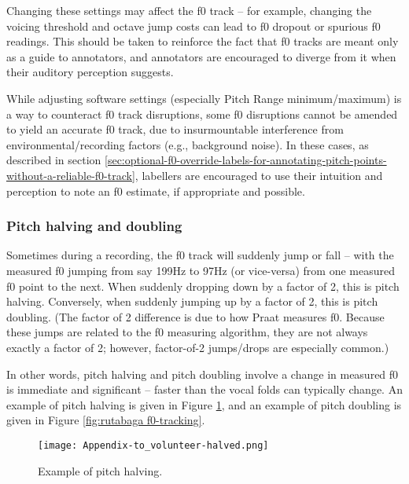 Changing these settings may affect the f0 track – for example, changing the voicing threshold and octave jump costs can lead to f0 dropout or spurious f0 readings. This should be taken to reinforce the fact that f0 tracks are meant only as a guide to annotators, and annotators are encouraged to diverge from it when their auditory perception suggests. 

While adjusting software settings (especially Pitch Range minimum\slash maximum) is a way to counteract f0 track disruptions, some f0 disruptions cannot be amended to yield an accurate f0 track, due to insurmountable interference from environmental\slash recording factors (e.g., background noise). In these cases, as described in section \ref{sec:optional-f0-override-labels-for-annotating-pitch-points-without-a-reliable-f0-track}, labellers are encouraged to use their intuition and perception to note an f0 estimate, if appropriate and possible. 

\subsubsection{Pitch halving and doubling}\label{sec:pitch-halving-and-doubling}

Sometimes during a recording, the f0 track will suddenly jump or fall – with the measured f0 jumping from say 199Hz to 97Hz (or vice-versa) from one measured f0 point to the next. When suddenly dropping down by a factor of 2, this is pitch halving. Conversely, when suddenly jumping up by a factor of 2, this is pitch doubling. (The factor of 2 difference is due to how Praat measures f0. Because these jumps are related to the f0 measuring algorithm, they are not always exactly a factor of 2; however, factor-of-2 jumps\slash drops are especially common.) 

In other words, pitch halving and pitch doubling involve a change in measured f0 is immediate and significant – faster than the vocal folds can typically change. An example of pitch halving is given in Figure \ref{fig:to volunteer-halved f0-tracking}, and an example of pitch doubling is given in Figure \ref{fig:rutabaga f0-tracking}.

\begin{figure}[H]
\centering
%
\texttt{[image: Appendix-to\_volunteer-halved.png]}
%
\caption{Example of pitch halving.%
\label{fig:to volunteer-halved f0-tracking}%
%
}
\end{figure}

